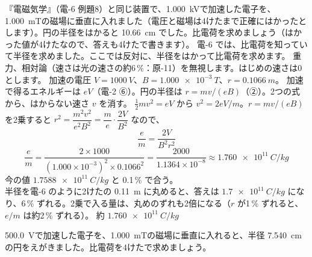 \label{ph:原-1:ex3}
\begin{phreidai}[電圧で加速した電子の円から比電荷を]
『電磁気学』（電-6 例題8）と同じ装置で、\qty{1.000}{kV}で加速した電子を、\qty{1.000}{mT}の磁場に垂直に入れました（電圧と磁場は4けたまで正確にはかったとします）。円の半径をはかると \qty{10.66}{cm} でした。比電荷を求めましょう（はかった値が4けたなので、答えも4けたで書きます）。
\phbamen
電-6 では、比電荷を知っていて半径を求めました。ここでは反対に、半径をはかって比電荷を求めます。
\phmushi
重力、相対論（速さは光の速さの約6\,\%：原-11）を無視します。はじめの速さは0とします。
\phzu
加速の電圧 $V=\qty{1000}{V}$、$B=\qty{1.000e-3}{T}$、$r=\qty{0.1066}{m}$。
\phriyu
加速で得るエネルギーは $eV$（電-2 ⑥）。円の半径は $r=mv/(eB)$（②）。2つの式から、はからない速さ $v$ を消す。
\phtateru
$\tfrac12mv^2=eV$ から $v^2=2eV/m$。$r=mv/(eB)$ を2乗すると $r^2=\dfrac{m^2v^2}{e^2B^2}=\dfrac{m}{e}\cdot\dfrac{2V}{B^2}$ なので、
\[ \frac{e}{m}=\frac{2V}{B^2r^2} \]
\phtoku
\[ \frac{e}{m}=\frac{2\times1000}{(1.000\times10^{-3})^2\times0.1066^2}=\frac{2000}{1.1364\times10^{-8}}\approx\qty{1.760e11}{C/kg} \]
\phtashikame
今の値 $\qty{1.7588e11}{C/kg}$ と 0.1\,\% で合う。\\
半径を電-6 のように2けたの \qty{0.11}{m} に丸めると、答えは $\qty{1.7e11}{C/kg}$ になり、6\,\% ずれる。2乗で入る量は、丸めのずれも2倍になる（$r$ が1\,\% ずれると、$e/m$ は約2\,\% ずれる）。
\kotae 約 $\qty{1.760e11}{C/kg}$
\end{phreidai}
\begin{jibun}
\qty{500.0}{V}で加速した電子を、\qty{1.000}{mT}の磁場に垂直に入れると、半径 \qty{7.540}{cm} の円をえがきました。比電荷を4けたで求めましょう。
\end{jibun}

